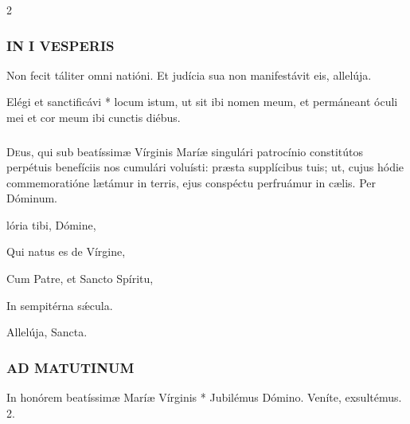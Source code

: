 \documentclass[9pt,twoside]{extarticle}
\begin{document}
\begin{multicols}{2}
\begin{tightlist}{}
\item {\small {}}
\end{tightlist}

\subsubsection*{\center \textsc{IN I VESPERIS}}
\begin{tightlist}{}
\item {\small {}}
\item {} Non fecit táliter omni natióni.  Et judícia sua non manifestávit eis, allelúja.
\item {} Elégi et sanctificávi * locum istum, ut sit ibi nomen meum, et permáneant óculi mei et cor meum ibi cunctis diébus.
\end{tightlist}

\subsubsection*{\center {}}
\lettrine{D}eus, qui sub beatíssimæ Vírginis Maríæ singulári patrocínio constitútos perpétuis benefíciis nos cumulári voluísti: præsta supplícibus tuis; ut, cujus hódie commemoratióne lætámur in terris, ejus conspéctu perfruámur in cælis. Per Dóminum.

\begin{tightlist}{}
\item {}
\item {}
\item {}
\item {}lória tibi, Dómine,
\item Qui natus es de Vírgine,
\item Cum Patre, et Sancto Spíritu,
\item In sempitérna sǽcula.
\item {\small {} Allelúja, Sancta.}
\end{tightlist}

\subsubsection*{\center \textsc{AD MATUTINUM}}
\begin{tightlist}{}
\item {} In honórem beatíssimæ Maríæ Vírginis * Jubilémus Dómino.
 Veníte, exsultémus. 2.
\end{tightlist}


\end{multicols}
\end{document}
